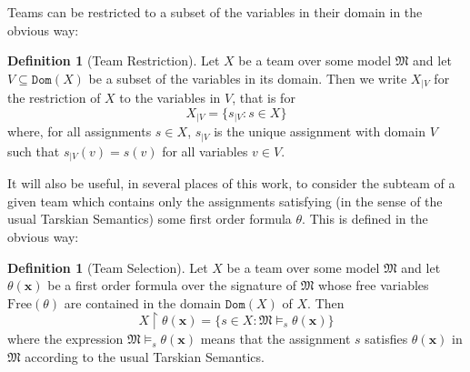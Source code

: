 \documentclass{article}
\theoremstyle{definition}
\newtheorem{Definition}[Theorem]{Definition}
\newcommand{\tuple}{\mathbf}
\newcommand{\M}{\mathfrak M}
\newcommand{\dom}{\texttt{Dom}}
\newcommand{\fv}{\text{Free}}
\begin{document}
Teams can be restricted to a subset of the variables in their domain in the obvious way: 
\begin{Definition}[Team Restriction]
Let $X$ be a team over some model $\M$ and let $V \subseteq \dom(X)$ be a subset of the variables in its domain. Then we write $X_{|V}$ for the restriction of $X$ to the variables in $V$, that is for 
\[
	X_{|V} = \{s_{|V} : s \in X\}
\]
where, for all assignments $s \in X$, $s_{|V}$ is the unique assignment with domain $V$ such that $s_{|V}(v) = s(v)$ for all variables $v \in V$. 
\end{Definition}

It will also be useful, in several places of this work, to consider the subteam of a given team which contains only the assignments satisfying (in the sense of the usual Tarskian Semantics) some first order formula $\theta$. This is defined in the obvious way: 
\begin{Definition}[Team Selection]
Let $X$ be a team over some model $\M$ and let $\theta(\tuple x)$ be a first order formula over the signature of $\M$ whose free variables $\fv(\theta)$ are contained in the domain $\dom(X)$ of $X$. Then
\[
X \upharpoonright \theta(\tuple x) = \{s \in X : \M \models_s \theta(\tuple x)\}
\]
where the expression $\M \models_s \theta(\tuple x)$ means that the assignment $s$ satisfies $\theta(\tuple x)$ in $\M$ according to the usual Tarskian Semantics. 
\end{Definition}
\end{document}

